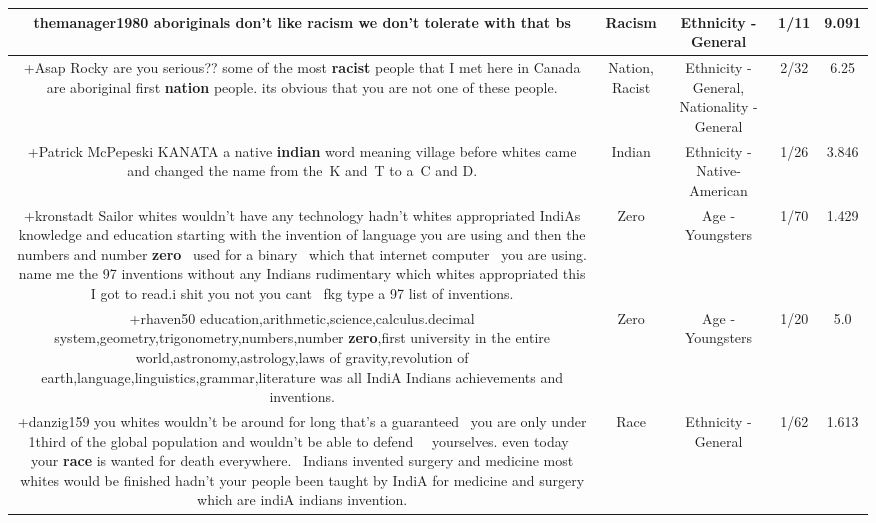 \documentclass[11pt]{article}
\newlength\mylength
\begin{document}
\begin{center}
\begin{longtable}{|C{.65\mylength}|C{.30\mylength}|C{.12\mylength}|C{.12\mylength}|C{.12\mylength}|}
  \small themanager1980 aboriginals don't like \textbf{racism} we don't tolerate with that bs\normalsize   & Racism & Ethnicity - General & 1/11 & 9.091 \\  \hline
  \small +Asap Rocky are you serious?? some of the most \textbf{racist} people that I met here in Canada are aboriginal first \textbf{nation} people. its obvious that you are not one of these people.\normalsize   & Nation, Racist & Ethnicity - General, Nationality - General & 2/32 & 6.25 \\  \hline
  \small +Patrick McPepeski KANATA a native \textbf{indian} word meaning village before whites came and changed the name from the K and T to a C and D.\normalsize   & Indian & Ethnicity - Native-American & 1/26 & 3.846 \\  \hline
  \small +kronstadt Sailor whites wouldn't have any technology hadn't whites appropriated IndiAs knowledge and education starting with the invention of language you are using and then the numbers and number \textbf{zero}  used for a binary  which that internet computer  you are using. name me the 97 inventions without any Indians rudimentary which whites appropriated this I got to read.i shit you not you cant  fkg type a 97 list of inventions.\normalsize   & Zero & Age - Youngsters & 1/70 & 1.429 \\  \hline
  \small +rhaven50 education,arithmetic,science,calculus.decimal system,geometry,trigonometry,numbers,number \textbf{zero},first university in the entire world,astronomy,astrology,laws of gravity,revolution of earth,language,linguistics,grammar,literature was all IndiA Indians achievements and inventions.\normalsize   & Zero & Age - Youngsters & 1/20 & 5.0 \\  \hline
  \small +danzig159 you whites wouldn't be around for long that's a guaranteed  you are only under 1third of the global population and wouldn't be able to defend   yourselves. even today  your \textbf{race} is wanted for death everywhere.  Indians invented surgery and medicine most whites would be finished hadn't your people been taught by IndiA for medicine and surgery which are indiA indians invention.\normalsize   & Race & Ethnicity - General & 1/62 & 1.613 \\  \hline

\end{longtable}
\end{center}
\end{document}
